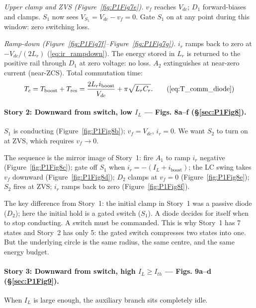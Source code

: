 \documentclass[12pt, a4paper]{article}
\def\,{ }%
\newcommand{\Vdc}{V_{dc}}
\newcommand{\vf}{v_f}
\newcommand{\ir}{i_r}
\newcommand{\IL}{I_L}
\newcommand{\Lr}{L_r}
\newcommand{\Cr}{C_r}
\newcommand{\Ith}{I_{th}}
\newcommand{\figref}[1]{Figure~\ref{#1}}
\begin{document}
\medskip\noindent
\textit{Upper clamp and ZVS (\figref{fig:P1Fig7e}).}
$\vf$ reaches $\Vdc$; $D_1$ forward-biases and clamps.
$S_1$ now sees $V_{S_1} = \Vdc - \vf = 0$.
Gate $S_1$ on at any point during this window: zero switching loss.

\medskip\noindent
\textit{Ramp-down (\figref{fig:P1Fig7f}--\figref{fig:P1Fig7g}).}
$\ir$ ramps back to zero at $-\Vdc/(2\Lr)$ (\eqref{eq:ir_rampdown}).
The energy stored in $\Lr$ is returned to the positive rail through $D_1$
at zero voltage: no loss.
$A_2$ extinguishes at near-zero current (near-ZCS).
Total commutation time:
\begin{equation}
    T_c = T_\text{boost} + T_\text{res}
        = \frac{2\Lr\,i_\text{boost}}{\Vdc} + \pi\sqrt{\Lr\Cr}.
    \tag{\ref{eq:T_comm_diode}}
\end{equation}

%
\paragraph{Story 2: Downward from switch, low $\IL$ --- Figs.\,8a--f
           (\S\ref{sec:P1Fig8}).}

$S_1$ is conducting (\figref{fig:P1Fig8b}); $\vf = \Vdc$, $\ir = 0$.
We want $S_2$ to turn on at ZVS, which requires $\vf \to 0$.

The sequence is the mirror image of Story~1:
fire $A_1$ to ramp $\ir$ negative (\figref{fig:P1Fig8c});
gate off $S_1$ when $\ir = -(I_L + i_\text{boost})$;
the LC swing takes $\vf$ downward (\figref{fig:P1Fig8d});
$D_2$ clamps at $\vf = 0$ (\figref{fig:P1Fig8e});
$S_2$ fires at ZVS;
$\ir$ ramps back to zero (\figref{fig:P1Fig8f}).

The key difference from Story~1: the initial clamp in Story~1 was a passive
diode ($D_2$); here the initial hold is a gated switch ($S_1$).
A diode decides for itself when to stop conducting.
A switch must be commanded.
This is why Story~1 has 7 states and Story~2 has only 5: the gated switch
compresses two states into one.
But the underlying circle is the same radius, the same centre, and the same
energy budget.

%
\paragraph{Story 3: Downward from switch, high $\IL \geq \Ith$ --- Figs.\,9a--d
           (\S\ref{sec:P1Fig9}).}

When $\IL$ is large enough, the auxiliary branch sits completely idle.
\end{document}

